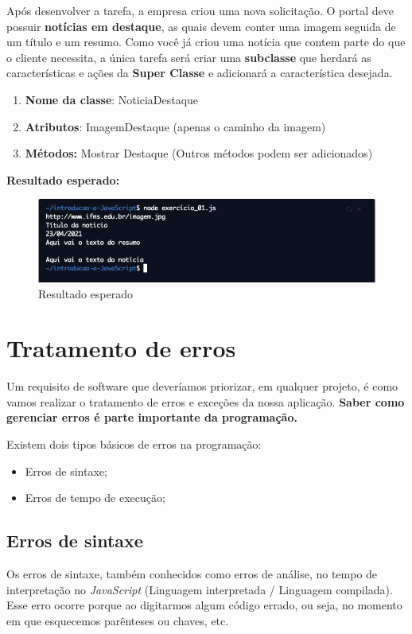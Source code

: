 Após desenvolver a tarefa, a empresa criou uma nova solicitação. O portal deve possuir \textbf{notícias em destaque}, as quais devem conter uma imagem seguida de um título e um resumo. Como você já criou uma notícia que contem parte do que o cliente necessita, a única tarefa será criar uma \textbf{subclasse} que herdará as características e ações da \textbf{Super Classe} e adicionará a característica desejada.

	\begin{enumerate}
	\item \textbf{Nome da classe}: NoticiaDestaque
	\item \textbf{Atributos}: ImagemDestaque (apenas o caminho da imagem)
	\item \textbf{Métodos:} Mostrar Destaque (Outros métodos podem ser adicionados)
\end{enumerate}

\textbf{Resultado esperado:} 

\begin{figure}[H]
	\centering
	\includegraphics[scale=0.5]{imagens/exercicio_heranca.png}
	\caption{Resultado esperado}
	\label{fig:resultado2}
\end{figure}

\section{Tratamento de erros}

Um requisito de software que deveríamos priorizar, em qualquer projeto, é como vamos realizar o tratamento de erros e exceções da nossa aplicação. 
\textbf{Saber como gerenciar erros é parte importante da programação.}

Existem dois tipos básicos de erros na programação:

\begin{itemize}
	\item Erros de sintaxe;
	\item Erros de tempo de execução;
\end{itemize}

\subsection{Erros de sintaxe}
Os erros de sintaxe, também conhecidos como erros de análise, no tempo de interpretação no \textit{JavaScript} (Linguagem interpretada / Linguagem compilada). Esse erro ocorre porque ao digitarmos algum código errado, ou seja, no momento em que esquecemos parênteses ou chaves, etc.	
	
